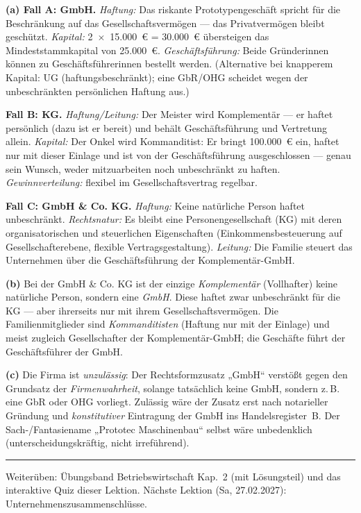 \documentclass[11pt, a4paper]{article}
\begin{document}
\begin{loesung}[title={Lösung Aufgabe~9 --- Fallaufgabe Rechtsformwahl}]
\textbf{(a) Fall A: GmbH.} \emph{Haftung:} Das riskante Prototypengeschäft spricht für
die Beschränkung auf das Gesellschaftsvermögen --- das Privatvermögen bleibt geschützt.
\emph{Kapital:} 2~$\times$~15.000~€ = 30.000~€ übersteigen das Mindeststammkapital von
25.000~€. \emph{Geschäftsführung:} Beide Gründerinnen können zu Geschäftsführerinnen
bestellt werden. (Alternative bei knapperem Kapital: UG (haftungsbeschränkt); eine GbR/OHG
scheidet wegen der unbeschränkten persönlichen Haftung aus.)

\textbf{Fall B: KG.} \emph{Haftung/Leitung:} Der Meister wird Komplementär --- er haftet
persönlich (dazu ist er bereit) und behält Geschäftsführung und Vertretung allein.
\emph{Kapital:} Der Onkel wird Kommanditist: Er bringt 100.000~€ ein, haftet nur mit
dieser Einlage und ist von der Geschäftsführung ausgeschlossen --- genau sein Wunsch,
weder mitzuarbeiten noch unbeschränkt zu haften. \emph{Gewinnverteilung:} flexibel im
Gesellschaftsvertrag regelbar.

\textbf{Fall C: GmbH \& Co. KG.} \emph{Haftung:} Keine natürliche Person haftet
unbeschränkt. \emph{Rechtsnatur:} Es bleibt eine Personengesellschaft (KG) mit deren
organisatorischen und steuerlichen Eigenschaften (Einkommensbesteuerung auf
Gesellschafterebene, flexible Vertragsgestaltung). \emph{Leitung:} Die Familie steuert
das Unternehmen über die Geschäftsführung der Komplementär-GmbH.

\textbf{(b)} Bei der GmbH \& Co. KG ist der einzige \emph{Komplementär} (Vollhafter)
keine natürliche Person, sondern eine \emph{GmbH}. Diese haftet zwar unbeschränkt für
die KG --- aber ihrerseits nur mit ihrem Gesellschaftsvermögen. Die Familienmitglieder
sind \emph{Kommanditisten} (Haftung nur mit der Einlage) und meist zugleich
Gesellschafter der Komplementär-GmbH; die Geschäfte führt der Geschäftsführer der GmbH.

\textbf{(c)} Die Firma ist \emph{unzulässig}: Der Rechtsformzusatz „GmbH`` verstößt gegen
den Grundsatz der \emph{Firmenwahrheit}, solange tatsächlich keine GmbH, sondern z.\,B.
eine GbR oder OHG vorliegt. Zulässig wäre der Zusatz erst nach notarieller Gründung und
\emph{konstitutiver} Eintragung der GmbH ins Handelsregister~B. Der Sach-/Fantasiename
„Prototec Maschinenbau`` selbst wäre unbedenklich (unterscheidungskräftig, nicht
irreführend).
\end{loesung}

\vspace{1em}
\hrule
\vspace{0.8em}
\noindent\textsf{\small Weiterüben: Übungsband Betriebswirtschaft Kap.~2 (mit Lösungsteil) und das
interaktive Quiz dieser Lektion. Nächste Lektion (Sa, 27.02.2027): Unternehmenszusammenschlüsse.}
\end{document}
